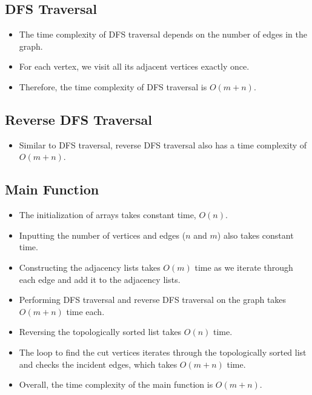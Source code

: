 \documentclass{article}
\begin{document}
\subsection*{DFS Traversal}

\begin{itemize}
    \item The time complexity of DFS traversal depends on the number of edges in the graph.
    \item For each vertex, we visit all its adjacent vertices exactly once.
    \item Therefore, the time complexity of DFS traversal is \(O(m + n)\).
\end{itemize}

\subsection*{Reverse DFS Traversal}

\begin{itemize}
    \item Similar to DFS traversal, reverse DFS traversal also has a time complexity of \(O(m + n)\).
\end{itemize}

\subsection*{Main Function}

\begin{itemize}
    \item The initialization of arrays takes constant time, \(O(n)\).
    \item Inputting the number of vertices and edges (\(n\) and \(m\)) also takes constant time.
    \item Constructing the adjacency lists takes \(O(m)\) time as we iterate through each edge and add it to the adjacency lists.
    \item Performing DFS traversal and reverse DFS traversal on the graph takes \(O(m + n)\) time each.
    \item Reversing the topologically sorted list takes \(O(n)\) time.
    \item The loop to find the cut vertices iterates through the topologically sorted list and checks the incident edges, which takes \(O(m + n)\) time.
    \item Overall, the time complexity of the main function is \(O(m + n)\).
\end{itemize}
\end{document}

